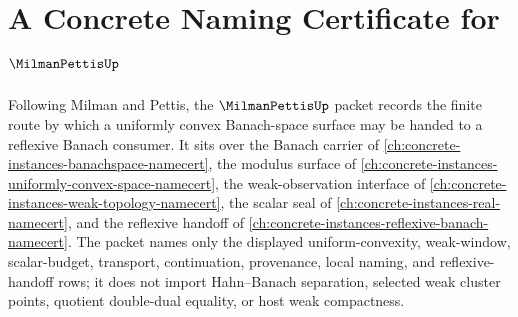 \chapter{A Concrete Naming Certificate for $\MilmanPettisUp$}
\label{ch:concrete-instances-milman-pettis-namecert}

Following Milman and Pettis, the $\MilmanPettisUp$ packet records the finite route by which a uniformly convex Banach-space surface may be handed to a reflexive Banach consumer. It sits over the Banach carrier of \autoref{ch:concrete-instances-banachspace-namecert}, the modulus surface of \autoref{ch:concrete-instances-uniformly-convex-space-namecert}, the weak-observation interface of \autoref{ch:concrete-instances-weak-topology-namecert}, the scalar seal of \autoref{ch:concrete-instances-real-namecert}, and the reflexive handoff of \autoref{ch:concrete-instances-reflexive-banach-namecert}. The packet names only the displayed uniform-convexity, weak-window, scalar-budget, transport, continuation, provenance, local naming, and reflexive-handoff rows; it does not import Hahn--Banach separation, selected weak cluster points, quotient double-dual equality, or host weak compactness.

